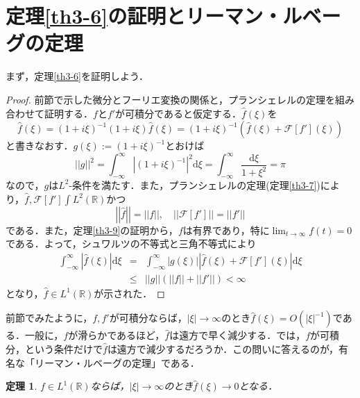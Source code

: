 \documentclass[a4j]{jsbook}
\newtheorem{theorem}{定理}
\numberwithin{theorem}{chapter}  %
\begin{document}
\section{定理\ref{th3-6}の証明とリーマン・ルベーグの定理} \label{sec3-7}
まず，定理\ref{th3-6}を証明しよう．
\begin{proof}
前節で示した微分とフーリエ変換の関係と，プランシェレルの定理を組み合わせて証明する．\(f\)と\(f'\)が可積分であると仮定する．\(\hat{f}(\xi)\)を
\begin{equation*}
    \hat{f}(\xi)=(1+i\xi)^{-1}(1+i\xi)\hat{f}(\xi)=(1+i\xi)^{-1}\left(\hat{f}(\xi)+\mathcal{F}[f'](\xi)\right)
\end{equation*}
と書きなおす．\(g(\xi):=(1+i\xi)^{-1}\)とおけば
\begin{equation*}
    ||g||^2=\int_{-\infty}^\infty\left|(1+i\xi)^{-1}\right|^2\mathrm{d}\xi=\int_{-\infty}^\infty\frac{\mathrm{d}\xi}{1+\xi^2}=\pi
\end{equation*}
なので，\(g\)は\(L^2\)-条件を満たす．また，プランシェレルの定理(定理\ref{th3-7})により，\(\hat{f}, \mathcal{F}[f']\int L^2(\mathbb{R})\)かつ
\begin{equation*}
    \left|\left|\hat{f}\right|\right|=||f||,\quad||\mathcal{F}[f']||=||f'||
\end{equation*}
である．また，定理\ref{th3-9}の証明から，\(f\)は有界であり，特に\(\displaystyle\lim_{t\to\infty}f(t)=0\)である．よって，シュワルツの不等式と三角不等式により
\begin{eqnarray*}
\int_{-\infty}^\infty\left|\hat{f}(\xi)\right|\mathrm{d}\xi&=&\int_{-\infty}^\infty|g(\xi)|\left|\hat{f}(\xi)+\mathcal{F}[f'](\xi)\right|\mathrm{d}\xi \\
&\leq&||g||\left(||f||+||f'||\right)<\infty
\end{eqnarray*}
となり，\(\hat{f}\in L^1(\mathbb{R})\)が示された．
\end{proof}
前節でみたように，\(f, f'\)が可積分ならば，\(|\xi|\to\infty\)のとき\(\hat{f}(\xi)=O\left(|\xi|^{-1}\right)\)である．一般に，\(f\)が滑らかであるほど，\(\hat{f}\)は遠方で早く減少する．では，\(f\)が可積分，という条件だけで\(\hat{f}\)は遠方で減少するだろうか．この問いに答えるのが，有名な「リーマン・ルベーグの定理」である．
\begin{theorem} 
\label{th3-12}
\(f\in L^1(\mathbb{R})\)ならば，\(|\xi|\to\infty\)のとき\(\hat{f}(\xi)\to 0\)となる．
\end{theorem}
\end{document}

